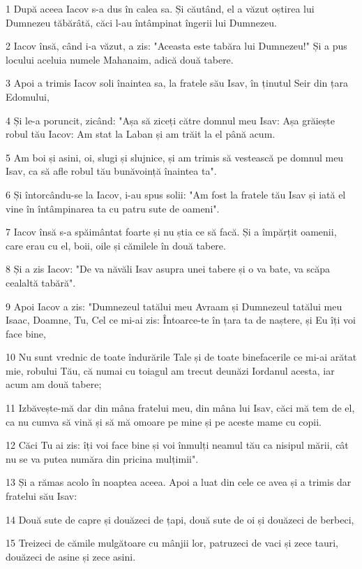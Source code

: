 \par 1 După aceea Iacov s-a dus în calea sa. Și căutând, el a văzut oștirea lui Dumnezeu tăbărâtă, căci l-au întâmpinat îngerii lui Dumnezeu.
\par 2 Iacov însă, când i-a văzut, a zis: "Aceasta este tabăra lui Dumnezeu!" Și a pus locului aceluia numele Mahanaim, adică două tabere.
\par 3 Apoi a trimis Iacov soli înaintea sa, la fratele său Isav, în ținutul Seir din țara Edomului,
\par 4 Și le-a poruncit, zicând: "Așa să ziceți către domnul meu Isav: Așa grăiește robul tău Iacov: Am stat la Laban și am trăit la el până acum.
\par 5 Am boi și asini, oi, slugi și slujnice, și am trimis să vestească pe domnul meu Isav, ca să afle robul tău bunăvoință înaintea ta".
\par 6 Și întorcându-se la Iacov, i-au spus solii: "Am fost la fratele tău Isav și iată el vine în întâmpinarea ta cu patru sute de oameni".
\par 7 Iacov însă s-a spăimântat foarte și nu știa ce să facă. Și a împărțit oamenii, care erau cu el, boii, oile și cămilele în două tabere.
\par 8 Și a zis Iacov: "De va năvăli Isav asupra unei tabere și o va bate, va scăpa cealaltă tabără".
\par 9 Apoi Iacov a zis: "Dumnezeul tatălui meu Avraam și Dumnezeul tatălui meu Isaac, Doamne, Tu, Cel ce mi-ai zis: Întoarce-te în țara ta de naștere, și Eu îți voi face bine,
\par 10 Nu sunt vrednic de toate îndurările Tale și de toate binefacerile ce mi-ai arătat mie, robului Tău, că numai cu toiagul am trecut deunăzi Iordanul acesta, iar acum am două tabere;
\par 11 Izbăvește-mă dar din mâna fratelui meu, din mâna lui Isav, căci mă tem de el, ca nu cumva să vină și să mă omoare pe mine și pe aceste mame cu copii.
\par 12 Căci Tu ai zis: îți voi face bine și voi înmulți neamul tău ca nisipul mării, cât nu se va putea număra din pricina mulțimii".
\par 13 Și a rămas acolo în noaptea aceea. Apoi a luat din cele ce avea și a trimis dar fratelui său Isav:
\par 14 Două sute de capre și douăzeci de țapi, două sute de oi și douăzeci de berbeci,
\par 15 Treizeci de cămile mulgătoare cu mânjii lor, patruzeci de vaci și zece tauri, douăzeci de asine și zece asini.
